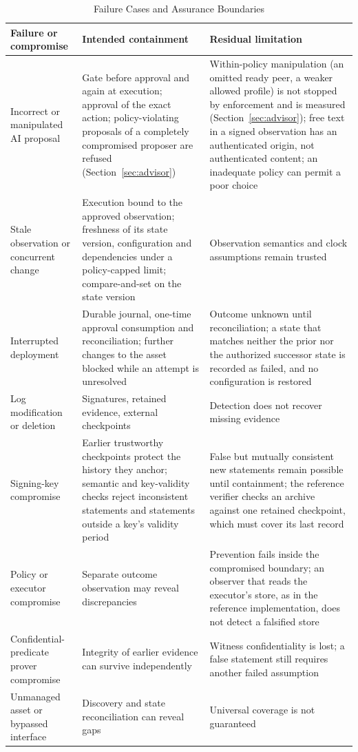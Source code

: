 \begin{table}[!t]
\caption{Failure Cases and Assurance Boundaries}
\label{tab:failures}
\centering
\begin{tabular}{>{\raggedright\arraybackslash}p{4.2cm}>{\raggedright\arraybackslash}p{5.8cm}>{\raggedright\arraybackslash}p{5.8cm}}
\toprule
Failure or compromise & Intended containment & Residual limitation \\
\midrule
Incorrect or manipulated AI proposal & Gate before approval and again at execution; approval of the exact action; policy-violating proposals of a completely compromised proposer are refused (Section~\ref{sec:advisor}) & Within-policy manipulation (an omitted ready peer, a weaker allowed profile) is not stopped by enforcement and is measured (Section~\ref{sec:advisor}); free text in a signed observation has an authenticated origin, not authenticated content; an inadequate policy can permit a poor choice \\
Stale observation or concurrent change & Execution bound to the approved observation; freshness of its state version, configuration and dependencies under a policy-capped limit; compare-and-set on the state version & Observation semantics and clock assumptions remain trusted \\
Interrupted deployment & Durable journal, one-time approval consumption and reconciliation; further changes to the asset blocked while an attempt is unresolved & Outcome unknown until reconciliation; a state that matches neither the prior nor the authorized successor state is recorded as failed, and no configuration is restored \\
Log modification or deletion & Signatures, retained evidence, external checkpoints & Detection does not recover missing evidence \\
Signing-key compromise & Earlier trustworthy checkpoints protect the history they anchor; semantic and key-validity checks reject inconsistent statements and statements outside a key's validity period & False but mutually consistent new statements remain possible until containment; the reference verifier checks an archive against one retained checkpoint, which must cover its last record \\
Policy or executor compromise & Separate outcome observation may reveal discrepancies & Prevention fails inside the compromised boundary; an observer that reads the executor's store, as in the reference implementation, does not detect a falsified store \\
Confidential-predicate prover compromise & Integrity of earlier evidence can survive independently & Witness confidentiality is lost; a false statement still requires another failed assumption \\
Unmanaged asset or bypassed interface & Discovery and state reconciliation can reveal gaps & Universal coverage is not guaranteed \\
\bottomrule
\end{tabular}
\end{table}
